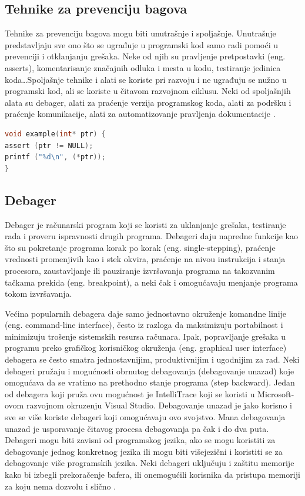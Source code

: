 \documentclass[a4paper]{article}
\begin{document}
\subsection{Tehnike za prevenciju bagova}
\label{subsec:Tehnike za prevenciju bagova}

Tehnike za prevenciju bagova mogu biti unutrašnje i spoljašnje. Unutrašnje
predstavljaju sve ono što se ugrađuje u programski kod samo radi pomoći u
prevenciji i otklanjanju grešaka. Neke od njih su pravljenje
pretpostavki (eng. asserts), komentarisanje značajnih odluka i mesta u kodu,
testiranje jedinica koda\ldots Spoljašnje tehnike i alati se koriste pri razvoju i
ne ugrađuju se nužno u programski kod, ali se koriste u čitavom razvojnom
ciklusu. Neki od spoljašnjih alata su debager, alati za praćenje verzija
programskog koda, alati za podršku i praćenje komunikacije, alati za
automatizovanje pravljenja dokumentacije \cite{bagovi_smalkov}.
\\

\begin{lstlisting}[language=C,caption=Primer korišćenja assert naredbe]
void example(int* ptr) {
assert (ptr != NULL);
printf ("%d\n", (*ptr));
}
\end{lstlisting}


\subsection{Debager}
\label{subsec:Debager}

Debager je računarski program koji se koristi za uklanjanje grešaka, testiranje
rada i proveru ispravnosti drugih programa. Debageri daju napredne funkcije kao
što su pokretanje programa korak po korak (eng. single-stepping), praćenje vrednosti
promenjivih kao i stek okvira, praćenje na nivou instrukcija i stanja procesora,
zaustavljanje ili pauziranje izvršavanja programa na takozvanim tačkama prekida
(eng. breakpoint), a neki čak i omogućavaju menjanje programa tokom izvršavanja.

Većina popularnih debagera daje samo jednostavno okruženje komandne linije
(eng. command-line interface), često iz razloga da maksimizuju portabilnost i
minimizuju trošenje sistemskih resursa računara. Ipak, popravljanje grešaka u
programu preko grafičkog korisničkog okruženja (eng. graphical user interface)
debagera se često smatra jednostavnijim, produktivnijim i ugodnijim za rad. Neki
debageri pružaju i mogućnosti obrnutog debagovanja (debagovanje unazad) koje
omogućava da se vratimo na prethodno stanje programa (step backward). Jedan od
debagera koji pruža ovu mogućnost je IntelliTrace koji se koristi u
Microsoft-ovom razvojnom okruzenju Visual Studio. Debagovanje unazad je jako
korisno i sve se više koriste debageri koji omogućavaju ovo svojstvo. Mana
debagovanja unazad je usporavanje čitavog procesa debagovanja pa čak i do dva
puta. Debageri mogu biti zavisni od programskog jezika, ako se mogu koristiti za
debagovanje jednog konkretnog jezika ili mogu biti višejezični i koristiti se za
debagovanje više programskih jezika. Neki debageri uključuju i zaštitu memorije
kako bi izbegli prekoračenje bafera, ili onemogućili korisnika da pristupa
memoriji za koju nema dozvolu i slično \cite{ssq_debug_def}.
\end{document}
